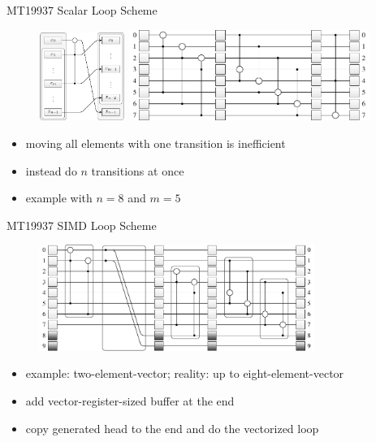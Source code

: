 \documentclass[aspectratio=169]{beamer}
\begin{document}
    \begin{frame}{MT19937 Scalar Loop Scheme}
      \begin{figure}
        \includegraphics[width=0.25\textwidth]{figures/mt19937_transition_short.pdf}
        \hfill
        \includegraphics[width=0.7\textwidth]{figures/mt19937_loop_scheme.pdf}
      \end{figure}
      \begin{itemize}
        \pause
        \item moving all elements with one transition is inefficient
        \pause
        \item instead do $n$ transitions at once
        \pause
        \item example with $n=8$ and $m=5$
      \end{itemize}
    \end{frame}

    \begin{frame}{MT19937 SIMD Loop Scheme}
      \begin{figure}
        \includegraphics[width=0.8\textwidth]{figures/mt19937_vector_loop_scheme.pdf}
      \end{figure}
      \begin{itemize}
        \pause
        \item example: two-element-vector; reality: up to eight-element-vector
        \pause
        \item add vector-register-sized buffer at the end
        \pause
        \item copy generated head to the end and do the vectorized loop
      \end{itemize}
    \end{frame}
\end{document}
